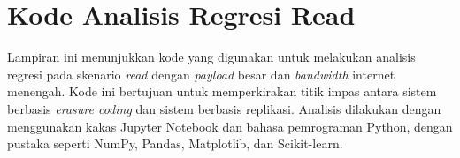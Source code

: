 \chapter{Kode Analisis Regresi Read}
\label{appendix:read-regression-code}

Lampiran ini menunjukkan kode yang digunakan untuk melakukan analisis regresi pada skenario \textit{read} dengan \textit{payload} besar dan \textit{bandwidth} internet menengah. Kode ini bertujuan untuk memperkirakan titik impas antara sistem berbasis \textit{erasure coding} dan sistem berbasis replikasi. Analisis dilakukan dengan menggunakan kakas Jupyter Notebook dan bahasa pemrograman Python, dengan pustaka seperti NumPy, Pandas, Matplotlib, dan Scikit-learn.

